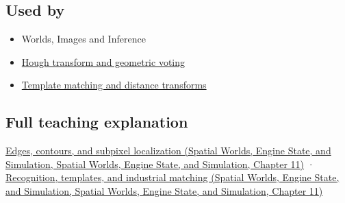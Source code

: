 \subsection{Used by}\label{appendix-36022286b03e-used-by}

\begin{itemize}
\tightlist
\item
  {Worlds, Images and Inference}
\item
  \hyperref[appendix-a5b0383b3b3e]{Hough transform and geometric voting}
\item
  \hyperref[appendix-5fb4af80d1c7]{Template matching and distance transforms}
\end{itemize}

\subsection{Full teaching explanation}\label{appendix-36022286b03e-full-teaching-explanation}

\href{../05-Spatial-Worlds-Engine-State-and-Simulation/main.pdf\#nameddest=04-visual-computing-ii-ch030-edges-contours-and-subpixel-localization}{Edges, contours, and subpixel localization (Spatial Worlds, Engine State, and Simulation, Spatial Worlds, Engine State, and Simulation, Chapter 11)} · \href{../05-Spatial-Worlds-Engine-State-and-Simulation/main.pdf\#nameddest=04-visual-computing-ii-ch030-recognition-templates-and-industrial-matching}{Recognition, templates, and industrial matching (Spatial Worlds, Engine State, and Simulation, Spatial Worlds, Engine State, and Simulation, Chapter 11)}
